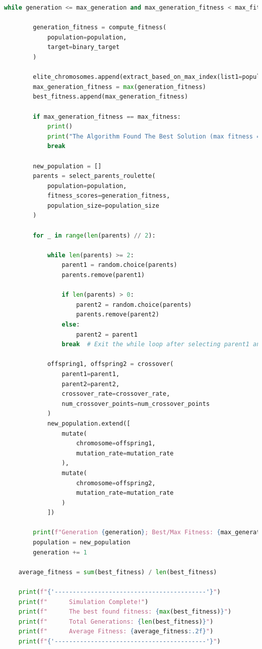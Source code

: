 \documentclass[12pt]{article}
\begin{document}
\begin{lstlisting}[language=Python, caption={Genetic Algorithm}, numbers=none, breaklines=true]
    while generation <= max_generation and max_generation_fitness < max_fitness:

        generation_fitness = compute_fitness(
            population=population,
            target=binary_target
        )

        elite_chromosomes.append(extract_based_on_max_index(list1=population, list2=generation_fitness))
        max_generation_fitness = max(generation_fitness)
        best_fitness.append(max_generation_fitness)

        if max_generation_fitness == max_fitness:
            print()
            print("The Algorithm Found The Best Solution (max fitness == max generation fitness)")
            break

        new_population = []
        parents = select_parents_roulette(
            population=population,
            fitness_scores=generation_fitness,
            population_size=population_size
        )

        for _ in range(len(parents) // 2):

            while len(parents) >= 2:
                parent1 = random.choice(parents)
                parents.remove(parent1)

                if len(parents) > 0:
                    parent2 = random.choice(parents)
                    parents.remove(parent2)
                else:
                    parent2 = parent1
                break  # Exit the while loop after selecting parent1 and parent2

            offspring1, offspring2 = crossover(
                parent1=parent1,
                parent2=parent2,
                crossover_rate=crossover_rate,
                num_crossover_points=num_crossover_points
            )
            new_population.extend([
                mutate(
                    chromosome=offspring1,
                    mutation_rate=mutation_rate
                ),
                mutate(
                    chromosome=offspring2,
                    mutation_rate=mutation_rate
                )
            ])

        print(f"Generation {generation}; Best/Max Fitness: {max_generation_fitness}/{max_fitness}")
        population = new_population
        generation += 1

    average_fitness = sum(best_fitness) / len(best_fitness)

    print(f"{'------------------------------------------'}")
    print(f"      Simulation Complete!")
    print(f"      The best found fitness: {max(best_fitness)}")
    print(f"      Total Generations: {len(best_fitness)}")
    print(f"      Average Fitness: {average_fitness:.2f}")
    print(f"{'------------------------------------------'}")


\end{lstlisting}
\end{document}
